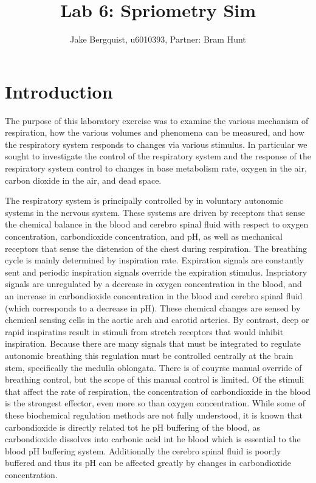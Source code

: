 \documentclass[12pt]{article}
\begin{document}
\title{Lab 6: Spriometry Sim}
\author{Jake Bergquist, u6010393, Partner: Bram Hunt }
\maketitle

\section{Introduction}
The purpose of this laboratory exercise was to examine the various mechanism of respiration, how the various volumes and phenomena can be measured, and how the respiratory system responds to changes via various stimulus. In particular we sought to investigate the control of the respiratory system and the response of the respiratory system control to changes in base metabolism rate, oxygen in the air, carbon dioxide in the air, and dead space. 

The respiratory system is principally controlled by in voluntary autonomic systems in the nervous system. These systems are driven by receptors that sense the chemical balance in the blood and cerebro spinal fluid with respect to oxygen concentration, carbondioxide concentration, and pH, as well as mechanical receptors that sense the distension of the chest during respiration. The breathing cycle is mainly determined by inspiration rate. Expiration signals are constantly sent and periodic inspiration signals override the expiration stimulus. Inspriatory signals are unregulated by a decrease in oxygen concentration in the blood, and an increase in carbondioxide concentration in the blood and cerebro spinal fluid (which corresponds to a decrease in pH). These chemical changes are sensed by chemical sensing cells in the aortic arch and carotid arteries. By contrast, deep or rapid inspiratins result in stimuli from stretch receptors that would inhibit inspiration. Because there are many signals that must be integrated to regulate autonomic breathing this regulation must be controlled centrally at the brain stem, specifically the medulla oblongata. There is of couyrse manual override of breathing control, but the scope of this manual control is limited. Of the stimuli that affect the rate of respiration, the concentration of carbondioxide in the blood is the strongest effector, even more so than oxygen concentration. While some of these biochemical regulation methods are not fully understood, it is known that carbondioxide is directly related tot he pH buffering of the blood, as carbondioxide dissolves into carbonic acid int he blood which is essential to the blood pH buffering system. Additionally the cerebro spinal fluid is poor;ly buffered and thus its pH can be affected greatly by changes in carbondioxide concentration.
\end{document}
